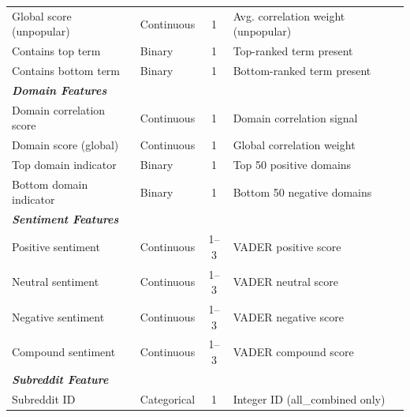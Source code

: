 \begin{longtable}[c]{llcp{6cm}}
\quad Global score (unpopular) & Continuous & 1 & Avg. correlation weight (unpopular) \\
\quad Contains top term & Binary & 1 & Top-ranked term present \\
\quad Contains bottom term & Binary & 1 & Bottom-ranked term present \\
\midrule
\multicolumn{4}{l}{\textit{\textbf{Domain Features}}} \\
\quad Domain correlation score & Continuous & 1 & Domain correlation signal \\
\quad Domain score (global) & Continuous & 1 & Global correlation weight \\
\quad Top domain indicator & Binary & 1 & Top 50 positive domains \\
\quad Bottom domain indicator & Binary & 1 & Bottom 50 negative domains \\
\midrule
\multicolumn{4}{l}{\textit{\textbf{Sentiment Features}}} \\
\quad Positive sentiment & Continuous & 1--3 & VADER positive score \\
\quad Neutral sentiment & Continuous & 1--3 & VADER neutral score \\
\quad Negative sentiment & Continuous & 1--3 & VADER negative score \\
\quad Compound sentiment & Continuous & 1--3 & VADER compound score \\
\midrule
\multicolumn{4}{l}{\textit{\textbf{Subreddit Feature}}} \\
\quad Subreddit ID & Categorical & 1 & Integer ID (all\_combined only) \\
\end{longtable}